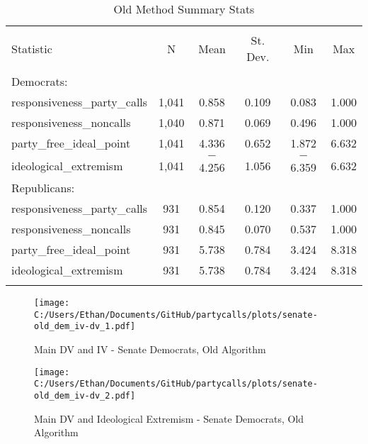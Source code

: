 \documentclass[12pt]{article}
\begin{document}
\begin{table}[!htbp] \centering 
	\caption{Old Method Summary Stats} 
	\begin{tabular}{@{\extracolsep{5pt}}lccccc} 
		\\[-1.8ex]\hline 
		\hline \\[-1.8ex] 
		Statistic & \multicolumn{1}{c}{N} & \multicolumn{1}{c}{Mean} & \multicolumn{1}{c}{St. Dev.} & \multicolumn{1}{c}{Min} & \multicolumn{1}{c}{Max} \\ 
		\hline \\[-1.8ex] 
		Democrats: & & & & & \\
		\hline
		responsiveness\_party\_calls & 1,041 & 0.858 & 0.109 & 0.083 & 1.000 \\ 
		responsiveness\_noncalls & 1,040 & 0.871 & 0.069 & 0.496 & 1.000 \\ 
		party\_free\_ideal\_point & 1,041 & 4.336 & 0.652 & 1.872 & 6.632 \\ 
		ideological\_extremism & 1,041 & $-$4.256 & 1.056 & $-$6.359 & 6.632 \\ 
		\hline
		Republicans: & & & & & \\
		\hline 
		responsiveness\_party\_calls & 931 & 0.854 & 0.120 & 0.337 & 1.000 \\ 
		responsiveness\_noncalls & 931 & 0.845 & 0.070 & 0.537 & 1.000 \\ 
		party\_free\_ideal\_point & 931 & 5.738 & 0.784 & 3.424 & 8.318 \\ 
		ideological\_extremism & 931 & 5.738 & 0.784 & 3.424 & 8.318 \\ 
		\hline \\[-1.8ex] 
	\end{tabular} 
\end{table} 

\begin{figure}[h]
	\caption{Main DV and IV - Senate Democrats, Old Algorithm}
	\texttt{[image: C:/Users/Ethan/Documents/GitHub/partycalls/plots/senate-old\_dem\_iv-dv\_1.pdf]}
\end{figure}

\begin{figure}[h]
	\caption{Main DV and Ideological Extremism - Senate Democrats, Old Algorithm}
	\texttt{[image: C:/Users/Ethan/Documents/GitHub/partycalls/plots/senate-old\_dem\_iv-dv\_2.pdf]}
\end{figure}
\end{document}
